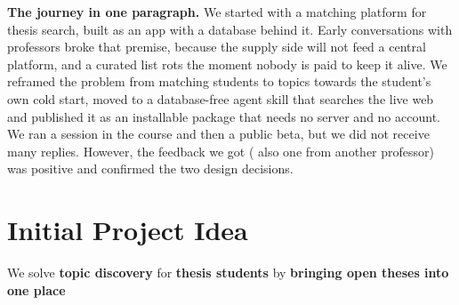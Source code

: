 \documentclass[11pt,a4paper]{article}
\begin{document}

\begin{tcolorbox}[colback=white,colframe=sosRule,boxrule=0.6pt,left=0.7em,right=0.7em,top=0.5em,bottom=0.5em]
\textbf{The journey in one paragraph.} We started with a matching platform for
thesis search, built as an app with a database behind it. Early conversations
with professors broke that premise, because the supply side will not feed a
central platform, and a curated list rots the moment nobody is paid to keep it
alive. We reframed the problem from matching students to topics towards the
student's own cold start, moved to a database-free agent skill that searches the
live web and published it as an installable package that needs no server and no
account.  We ran a session in the course and then a public beta, but we did not receive many replies.
However, the feedback we got ( also one from another professor) was positive and confirmed the two design decisions.
\end{tcolorbox}

\section{Initial Project Idea}

\begin{infobox}
We solve \textbf{topic discovery} for \textbf{thesis students} by \textbf{bringing open theses into one place}
\end{infobox}
\end{document}
